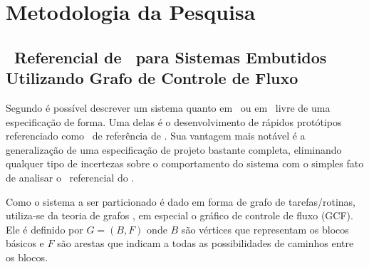\section{Metodologia da Pesquisa}

\subsection{\Design\ Referencial de \Software\ para Sistemas Embutidos Utilizando Grafo de Controle de Fluxo} \label{chap:design} \label{sec:GCF}

	Segundo \cite{Sass2010} é possível descrever um sistema quanto em \hardware\ ou em \software\ livre de uma especificação de forma. 
    Uma delas é o desenvolvimento de rápidos protótipos referenciado como \design\ de referência de \software.
	Sua vantagem mais notável é a generalização de uma especificação de projeto bastante completa, eliminando qualquer tipo de incertezas sobre o comportamento do sistema com o simples fato de analisar o \design\ referencial do \software.

    Como o sistema a ser particionado é dado em forma de grafo de tarefas/rotinas, utiliza-se da teoria de grafos \cite{Mann2007}, em especial o gráfico de controle de fluxo (GCF). 
    Ele é definido por $ G = (B, F) $ onde $ B $ são vértices que representam os blocos básicos e $ F $ são arestas que indicam a todas as possibilidades de caminhos entre os blocos. 

